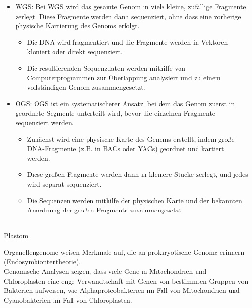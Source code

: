\begin{itemize}
    \item \underline{WGS}: Bei WGS wird das gesamte Genom in viele kleine, zufällige Fragmente zerlegt. Diese Fragmente werden dann sequenziert, ohne dass eine vorherige physische Kartierung des Genoms erfolgt.
    \begin{itemize}
        \item Die DNA wird fragmentiert und die Fragmente werden in Vektoren kloniert oder direkt sequenziert.
        \item Die resultierenden Sequenzdaten werden mithilfe von Computerprogrammen zur Überlappung analysiert und zu einem vollständigen Genom zusammengesetzt.
    \end{itemize}
    \item \underline{OGS}: OGS ist ein systematischerer Ansatz, bei dem das Genom zuerst in geordnete Segmente unterteilt wird, bevor die einzelnen Fragmente sequenziert werden.
    \begin{itemize}
        \item Zunächst wird eine physische Karte des Genoms erstellt, indem große DNA-Fragmente (z.B. in BACs oder YACs) geordnet und kartiert werden.
        \item Diese großen Fragmente werden dann in kleinere Stücke zerlegt, und jedes wird separat sequenziert.
        \item Die Sequenzen werden mithilfe der physischen Karte und der bekannten Anordnung der großen Fragmente zusammengesetzt.
    \end{itemize}
\end{itemize} $\ $ \\ 

Plastom \\ \newline

Organellengenome weisen Merkmale auf, die an prokaryotische Genome erinnern (Endosymbiontentheorie). \\
Genomische Analysen zeigen, dass viele Gene in Mitochondrien und Chloroplasten eine enge Verwandtschaft mit Genen von bestimmten Gruppen von Bakterien aufweisen, wie Alphaproteobakterien im Fall von Mitochondrien und Cyanobakterien im Fall von Chloroplasten. \\ \newline

